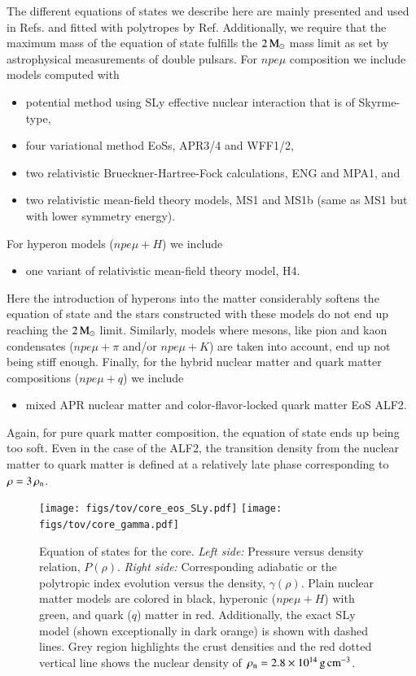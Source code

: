 The different equations of states we describe here are mainly presented and used in Refs.\cite{LP01, Bejger05, H4} and fitted with polytropes by Ref.\cite{Read09}
Additionally, we require that the maximum mass of the equation of state fulfills the $2\, \mathrm{M}_{\odot}$ mass limit as set by astrophysical measurements of double pulsars.\cite{DPR10, AFW13, Fonseca16}
For $npe\mu$ composition we include models computed with
\begin{itemize}
    \item potential method using SLy effective nuclear interaction that is of Skyrme-type\cite{SLy},
    \item four variational method EoSs, APR3/4\cite{APR} and WFF1/2\cite{WFF},
    \item two relativistic Brueckner-Hartree-Fock calculations, ENG\cite{ENG} and MPA1\cite{MPA}, and
    \item two relativistic mean-field theory models, MS1 and MS1b (same as MS1 but with lower symmetry energy)\cite{MS}.
\end{itemize}
For hyperon models ($npe\mu + H$) we include
\begin{itemize}
    \item one variant of relativistic mean-field theory model, H4\cite{H4}.
\end{itemize}
Here the introduction of hyperons into the matter considerably softens the equation of state and the stars constructed with these models do not end up reaching the $2\, \mathrm{M}_{\odot}$ limit.
Similarly, models where mesons, like pion and kaon condensates ($npe\mu + \pi$ and/or $npe\mu + K$) are taken into account, end up not being stiff enough.
Finally, for the hybrid nuclear matter and quark matter compositions ($npe\mu + q$) we include 
\begin{itemize}
    \item mixed APR nuclear matter and color-flavor-locked quark matter EoS ALF2.\cite{ALF}
\end{itemize}
Again, for pure quark matter composition, the equation of state ends up being too soft. 
Even in the case of the ALF2, the transition density from the nuclear matter to quark matter is defined at a relatively late phase corresponding to $\rho = 3\, \rho_{\mathrm{n}} $.

\begin{figure}[t]
\centering
\texttt{[image: figs/tov/core\_eos\_SLy.pdf]}
\texttt{[image: figs/tov/core\_gamma.pdf]}
\caption{\label{fig:coreGamma}
Equation of states for the core.
\emph{Left side:} Pressure versus density relation, $P(\rho)$.
\emph{Right side:} Corresponding adiabatic or the polytropic index evolution versus the density, $\gamma(\rho)$.
Plain nuclear matter models are colored in black, hyperonic ($npe\mu+H$) with green, and quark ($q$) matter in red.
Additionally, the exact SLy model (shown exceptionally in dark orange) is shown with dashed lines.
Grey region highlights the crust densities and the red dotted vertical line shows the nuclear density of $\, \rho_{\mathrm{n}}  = 2.8 \times 10^{14}\, \mathrm{g}\,\mathrm{cm}^{-3}$.
}
\end{figure}

